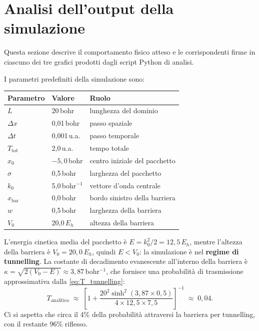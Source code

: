 \documentclass[12pt, a4paper]{article}
\newcommand{\dt}{\Delta t}
\newcommand{\dx}{\Delta x}
\begin{document}
\section{Analisi dell'output della simulazione}

Questa sezione descrive il comportamento fisico atteso e le
corrispondenti firme in ciascuno dei tre grafici prodotti dagli script
Python di analisi.

I parametri predefiniti della simulazione sono:
\begin{center}
\begin{tabular}{lll}
\hline
Parametro & Valore & Ruolo \\
\hline
$L$ & 20\,bohr & lunghezza del dominio \\
$\dx$ & 0,01\,bohr & passo spaziale \\
$\dt$ & 0,001\,u.a. & passo temporale \\
$T_\text{tot}$ & 2,0\,u.a. & tempo totale \\
$x_0$ & $-5{,}0$\,bohr & centro iniziale del pacchetto \\
$\sigma$ & 0,5\,bohr & larghezza del pacchetto \\
$k_0$ & 5,0\,bohr$^{-1}$ & vettore d'onda centrale \\
$x_\text{bar}$ & 0,0\,bohr & bordo sinistro della barriera \\
$w$ & 0,5\,bohr & larghezza della barriera \\
$V_0$ & 20,0\,$E_h$ & altezza della barriera \\
\hline
\end{tabular}
\end{center}

L'energia cinetica media del pacchetto è $E = k_0^2/2 = 12{,}5\,E_h$,
mentre l'altezza della barriera è $V_0 = 20{,}0\,E_h$, quindi
$E < V_0$: la simulazione è nel \textbf{regime di tunnelling}.
La costante di decadimento evanescente all'interno della barriera è
$\kappa = \sqrt{2(V_0-E)} \approx 3{,}87$\,bohr$^{-1}$, che fornisce
una probabilità di trasmissione approssimativa dalla
\eqref{eq:T_tunnelling}:
\begin{equation}
  T_\text{analitico} \;\approx\;
  \left[1 + \frac{20^2\sinh^2(3{,}87\times 0{,}5)}{4\times 12{,}5\times 7{,}5}
  \right]^{-1}
  \;\approx\; 0{,}04.
  \label{eq:T_predicted}
\end{equation}
Ci si aspetta che circa il 4\% della probabilità attraversi la
barriera per tunnelling, con il restante 96\% riflesso.
\end{document}
